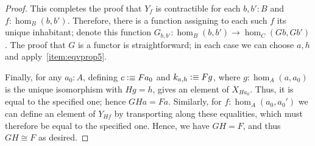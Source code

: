 \documentclass[10pt,a4paper]{article}
\newcommand{\defeq}{\vcentcolon\equiv}  %
\theoremstyle{definition}
\theoremstyle{remark}
\numberwithin{equation}{section}
\begin{document}
\begin{proof}
  This completes the proof that $Y_f$ is contractible for each $b,b':B$ and $f:\hom_B(b,b')$.
  Therefore, there is a function assigning to each such $f$ its unique inhabitant; denote this function $G_{b,b'}:\hom_B(b,b') \to \hom_C(Gb,Gb')$.
  The proof that $G$ is a functor is straightforward; in each case we can choose $a,h$ and apply~\ref{item:eqvprop5}.

  Finally, for any $a_0:A$, defining $c\defeq Fa_0$ and $k_{a,h}\defeq F g$, where $g:\hom_A(a,a_0)$ is the unique isomorphism with $Hg = h$, gives an element of $X_{Ha_0}$.
  Thus, it is equal to the specified one; hence $GHa=Fa$.
  Similarly, for $f:\hom_A(a_0,a_0')$ we can define an element of $Y_{Hf}$ by transporting along these equalities, which must therefore be equal to the specified one.
  Hence, we have $GH=F$, and thus $GH\cong F$ as desired.
\end{proof}



\end{document}
